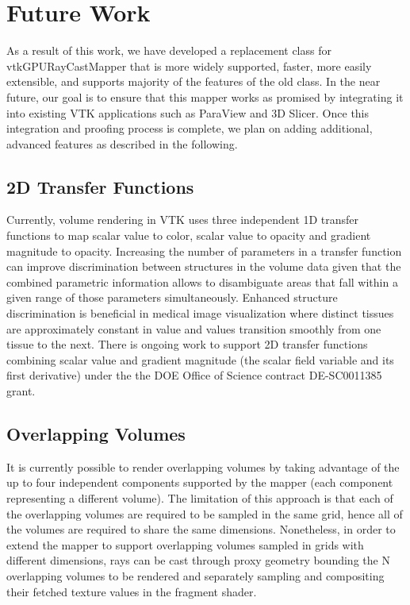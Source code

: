 \section{Future Work}
\label{future-work}
As a result of this work, we have developed a replacement class for
vtkGPURayCastMapper that is more widely supported, faster, more easily
extensible, and supports majority of the features of the old class. In the
near future, our goal is to ensure that this mapper works as promised by
integrating it into existing VTK applications such as ParaView and 3D Slicer.
Once this integration and proofing process is complete, we plan on adding
additional, advanced features as described in the following.

\subsection{2D Transfer Functions}
\label{2d-transfer-functions}
Currently, volume rendering in VTK uses three independent 1D transfer functions
to map scalar value to color, scalar value to opacity and gradient magnitude to
opacity. Increasing the number of parameters in a transfer function can improve
discrimination between structures in the volume data given that the combined
parametric information allows to disambiguate areas that fall within a given range
of those parameters simultaneously. Enhanced structure discrimination is beneficial
in medical image visualization where distinct tissues are approximately constant
in value and values transition smoothly from one tissue to the next. There is ongoing
work to support 2D transfer functions combining scalar value and gradient magnitude
(the scalar field variable and its first derivative) under the the DOE Office of
Science contract DE-SC0011385 grant.

\subsection{Overlapping Volumes}
\label{overlapping-volumes}
It is currently possible to render overlapping volumes by taking advantage of
the up to four independent components supported by the mapper (each component
representing a different volume).
The limitation of this approach is that each of the overlapping volumes are
required to be sampled in the same grid, hence all of the volumes are required
to share the same dimensions.  Nonetheless, in order to extend the mapper to
support overlapping volumes sampled in grids with different dimensions, rays
can be cast through proxy geometry bounding the N overlapping volumes to be
rendered and separately sampling and compositing their fetched texture values in
the fragment shader.

